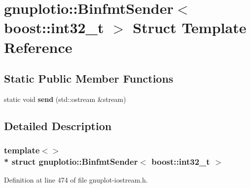 \hypertarget{structgnuplotio_1_1_binfmt_sender_3_01boost_1_1int32__t_01_4}{}\section{gnuplotio\+:\+:Binfmt\+Sender$<$ boost\+:\+:int32\+\_\+t $>$ Struct Template Reference}
\label{structgnuplotio_1_1_binfmt_sender_3_01boost_1_1int32__t_01_4}
\subsection*{Static Public Member Functions}
\begin{DoxyCompactItemize}
\item 
static void {\bfseries send} (std\+::ostream \&stream)\hypertarget{structgnuplotio_1_1_binfmt_sender_3_01boost_1_1int32__t_01_4_a44f75b80ef3f5def62eaa2093810fd35}{}\label{structgnuplotio_1_1_binfmt_sender_3_01boost_1_1int32__t_01_4_a44f75b80ef3f5def62eaa2093810fd35}

\end{DoxyCompactItemize}


\subsection{Detailed Description}
\subsubsection*{template$<$$>$\\*
struct gnuplotio\+::\+Binfmt\+Sender$<$ boost\+::int32\+\_\+t $>$}



Definition at line 474 of file gnuplot-\/iostream.\+h.

